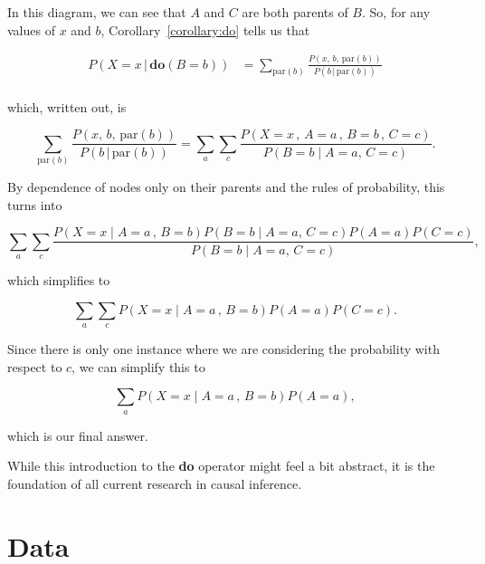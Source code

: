 \documentclass{article}
\begin{document}
In this diagram, we can see that $A$ and $C$ are both parents of $B$. So, for any values of $x$ and $b$, 
Corollary~\ref{corollary:do} tells us that

\begin{align*}
    P(X = x \,|\, \textbf{do}(B=b)) &= \sum_{\text{par}(b)}\frac{P(x, \,b, \,\text{par}(b))}{P(b\,|\, \text{par}(b))} \\
\end{align*}

which, written out, is 

\begin{equation*}
    \sum_{\text{par}(b)}\frac{P(x, \,b, \,\text{par}(b))}{P(b\,|\, \text{par}(b))} = \sum_{a}\sum_{c}\frac{P(X=x\,, \, A=a\,,\, B=b \, ,\, C=c)}{P(B=b \;|\; A=a,\, C=c)}.
\end{equation*}

By dependence of nodes only on their parents and the rules of probability, this turns into

\begin{equation*}
    \sum_{a}\sum_{c}\frac{P(X=x\;|\; A=a\,,\, B=b)P(B=b\;|\; A=a,\, C=c)P(A=a)P(C=c)}{P(B=b \;|\; A=a,\, C=c)},
\end{equation*}

which simplifies to

\begin{equation*}
    \sum_{a}\sum_{c}P(X=x\;|\; A=a\,,\, B=b)P(A=a)P(C=c).
\end{equation*}

Since there is only one instance where we are considering the probability with respect to $c$, 
we can simplify this to

\begin{equation*}
    \sum_{a}P(X=x\;|\; A=a\,,\, B=b)P(A=a),
\end{equation*}

which is our final answer.

While this introduction to the \textbf{do} operator might feel a bit abstract, it is the foundation
of all current research in causal inference. 

\section{Data}
\end{document}
